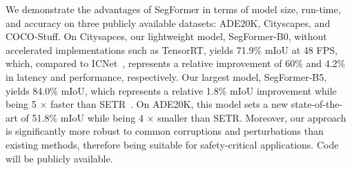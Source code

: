 We demonstrate the advantages of SegFormer in terms of model size, run-time, and accuracy on three publicly available datasets: ADE20K, Cityscapes, and COCO-Stuff. On Citysapces, our lightweight model, SegFormer-B0, without accelerated implementations such as TensorRT, yields 71.9\% mIoU at 48 FPS, which, compared to ICNet~\cite{icnet}, represents a relative improvement of 60\% and 4.2\% in latency and performance, respectively. Our largest model, SegFormer-B5, yields 84.0\% mIoU, which represents a relative 1.8\% mIoU improvement while being 5 $\times$ faster than SETR~\cite{setr}. On ADE20K, this model sets a new state-of-the-art of 51.8\% mIoU while being 4 $\times$ smaller than SETR. Moreover, our approach is significantly more robust to common corruptions and perturbations than existing methods, therefore being suitable for safety-critical applications. Code will be publicly available.

